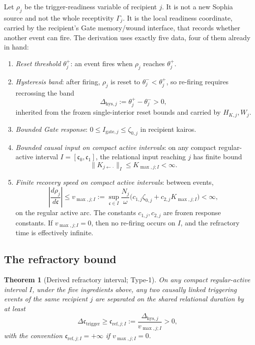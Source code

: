 \documentclass[11pt,a4paper]{article}
\theoremstyle{definition}
\theoremstyle{plain}
\newtheorem{theorem}[definition]{Theorem}
\theoremstyle{remark}
\begin{document}
Let \(\rho_j\) be the trigger-readiness variable of recipient \(j\). It is not a
new Sophia source and not the whole receptivity \(\Gamma_j\). It is the local
readiness coordinate, carried by the recipient's Gate memory/wound interface, that
records whether another event can fire. The derivation uses exactly five data,
four of them already in hand:
\begin{enumerate}[label=\textup{(\arabic*)},leftmargin=1.2cm]
\item \emph{Reset threshold} \(\theta_j^{+}\): an event fires when \(\rho_j\) reaches
\(\theta_j^{+}\).
\item \emph{Hysteresis band}: after firing, \(\rho_j\) is reset to
\(\theta_j^{-}<\theta_j^{+}\), so re-firing requires recrossing the band
\[
\Delta_{\mathrm{hys},j}:=\theta_j^{+}-\theta_j^{-}>0,
\]
inherited from the frozen single-interior reset bounds and carried by
\(H_{K,j},W_j\).
\item \emph{Bounded Gate response}: \(0\le I_{\mathrm{gate},j}\le\zeta_{0,j}\) in
recipient kairos.
\item \emph{Bounded causal input on compact active intervals}: on any compact
regular-active interval \(I=[\mathfrak c_0,\mathfrak c_1]\), the relational input
reaching \(j\) has finite bound
\[
\lVert K_{j\leftarrow\cdot}\rVert_I\le K_{\max,j;I}<\infty.
\]
\item \emph{Finite recovery speed on compact active intervals}: between events,
\[
\left|\frac{d\rho_j}{d\mathfrak c}\right|
\le
v_{\max,j;I}
:=
\sup_{\mathfrak c\in I}
\frac{N_j}{\omega}
\bigl(c_{1,j}\zeta_{0,j}+c_{2,j}K_{\max,j;I}\bigr)
<\infty,
\]
on the regular active arc. The constants \(c_{1,j},c_{2,j}\) are frozen response
constants. If \(v_{\max,j;I}=0\), then no re-firing occurs on \(I\), and the
refractory time is effectively infinite.
\end{enumerate}

\subsection{The refractory bound}

\begin{theorem}[Derived refractory interval; Type-1]\label{thm:refractory}
On any compact regular-active interval \(I\), under the five ingredients above,
any two causally linked triggering events of the same recipient \(j\) are separated
on the shared relational duration by at least
\[
\boxed{\;
\Delta\mathfrak c_{\mathrm{trigger}}
\ge
\mathfrak c_{\mathrm{ref},j;I}
:=
\frac{\Delta_{\mathrm{hys},j}}{v_{\max,j;I}}
>0,
\;}
\]
with the convention \(\mathfrak c_{\mathrm{ref},j;I}=+\infty\) if
\(v_{\max,j;I}=0\).
\end{theorem}
\end{document}
